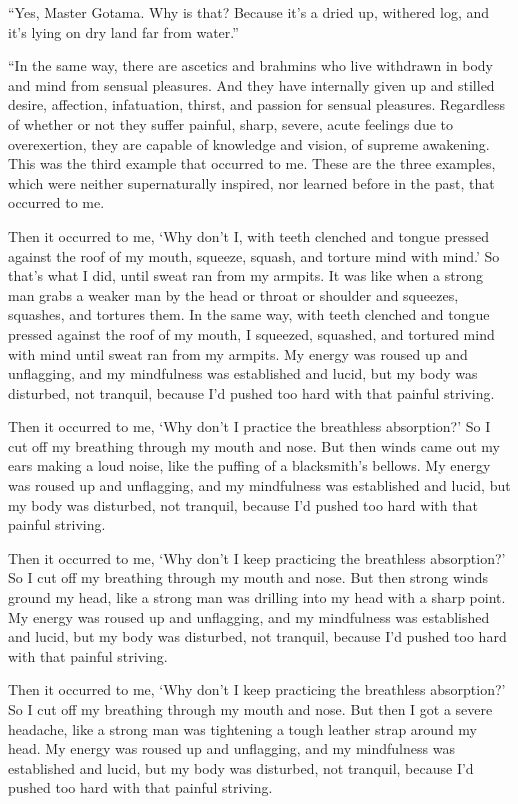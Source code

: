 \documentclass[12pt,openany]{book}%
\begin{document}
“Yes, Master Gotama. Why is that? Because it’s a dried up, withered log, and it’s lying on dry land far from water.” 

“In the same way, there are ascetics and brahmins who live withdrawn in body and mind from sensual pleasures. And they have internally given up and stilled desire, affection, infatuation, thirst, and passion for sensual pleasures. Regardless of whether or not they suffer painful, sharp, severe, acute feelings due to overexertion, they are capable of knowledge and vision, of supreme awakening. This was the third example that occurred to me. These are the three examples, which were neither supernaturally inspired, nor learned before in the past, that occurred to me. 

Then it occurred to me, ‘Why don’t I, with teeth clenched and tongue pressed against the roof of my mouth, squeeze, squash, and torture mind with mind.’ So that’s what I did, until sweat ran from my armpits. It was like when a strong man grabs a weaker man by the head or throat or shoulder and squeezes, squashes, and tortures them. In the same way, with teeth clenched and tongue pressed against the roof of my mouth, I squeezed, squashed, and tortured mind with mind until sweat ran from my armpits. My energy was roused up and unflagging, and my mindfulness was established and lucid, but my body was disturbed, not tranquil, because I’d pushed too hard with that painful striving. 

Then it occurred to me, ‘Why don’t I practice the breathless absorption?’ So I cut off my breathing through my mouth and nose. But then winds came out my ears making a loud noise, like the puffing of a blacksmith’s bellows. My energy was roused up and unflagging, and my mindfulness was established and lucid, but my body was disturbed, not tranquil, because I’d pushed too hard with that painful striving. 

Then it occurred to me, ‘Why don’t I keep practicing the breathless absorption?’ So I cut off my breathing through my mouth and nose. But then strong winds ground my head, like a strong man was drilling into my head with a sharp point. My energy was roused up and unflagging, and my mindfulness was established and lucid, but my body was disturbed, not tranquil, because I’d pushed too hard with that painful striving. 

Then it occurred to me, ‘Why don’t I keep practicing the breathless absorption?’ So I cut off my breathing through my mouth and nose. But then I got a severe headache, like a strong man was tightening a tough leather strap around my head. My energy was roused up and unflagging, and my mindfulness was established and lucid, but my body was disturbed, not tranquil, because I’d pushed too hard with that painful striving. 
\end{document}
